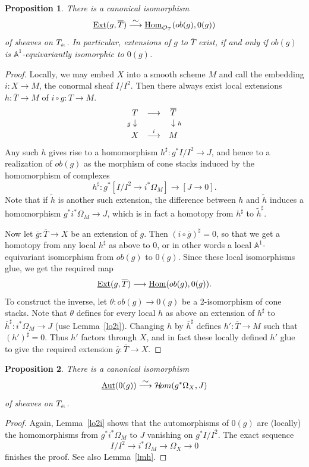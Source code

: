 \documentclass[11pt]{article}
\theoremstyle{plain}
\newtheorem{prop}{Proposition}[section]
\theoremstyle{definition}
\newenvironment{pf}{\begin{proof}}{\end{proof}}
\renewcommand{\tilde}{\widetilde}
\newcommand{\et}{{\mbox{\tiny \'{e}t}}}
\newcommand{\upst}{^{\ast}}
\newcommand{\aaa}{{\mathbb{A}}}
\renewcommand{\O}{{\mathcal{O}}}
\newcommand{\hH}{{\mathcal{H}}}
\newcommand{\Hom}{\mathop{\rm Hom}\nolimits}
\newcommand{\Ext}{\mathop{\rm Ext}\nolimits}
\newcommand{\sheafhom}{\mathop{\rm {\mit{ \hH\! om}}}\nolimits}
\newcommand{\Aut}{\mathop{\rm Aut}\nolimits}
\newcommand{\comp}{\mathbin{{\scriptstyle\circ}}}
\newcommand{\ol}{\overline}
\renewcommand{\ul}{\underline}
\newcommand{\ldiag}[1]
       {\makebox[0cm]{\({\scriptstyle#1}\downarrow\phantom{\scriptstyle#1}\)}}
\newcommand{\rdiag}[1]
       {\makebox[0cm]{\(\phantom{\scriptstyle#1}\downarrow{\scriptstyle#1}\)}}
\newcommand{\longiso}{\stackrel{\textstyle\sim}{\longrightarrow}}
\newcommand{\comdia}[9]{
\begin{array}{ccc}
#1 & \stackrel{#2}{\longrightarrow} & #3 \\
\ldiag{#4} & #5 & \rdiag{#6} \\
#7 & \stackrel{#8}{\longrightarrow} & #9
\end{array}}
\providecommand{\Aut}{\operatorname{Aut}}
\providecommand{\Ext}{\operatorname{Ext}}
\theoremstyle{plain}
\theoremstyle{definition}
\theoremstyle{remark}
\begin{document}
\begin{prop} \label{ince}
There is a canonical isomorphism
\[
\ul{\Ext}(g,\ol{T})\longiso\ul{\Hom}_{\O_T}(ob(g),0(g))
\]
of sheaves on \(T_\et\). In particular, extensions of \(g\) to \(\ol T\)
exist, if and only if \(ob(g)\) is \(\aaa^1\)-equivariantly isomorphic to
\(0(g)\).
\end{prop}
\begin{pf}
Locally, we may embed \(X\) into a smooth scheme \(M\) and call the
embedding \(i:X\to M\), the conormal sheaf \(I/I^2\). Then there always
exist local extensions \(h:\ol{T}\to M\) of \(i\comp g:T\to M\).
\[
\comdia{T}{}{\ol T}{g}{}{h}{X}{i}{M}
\]
Any such \(h\) gives rise to a homomorphism \(h^\sharp:g\upst I/I^2\to
J\), and hence to a realization of \(ob(g)\) as the morphism of cone
stacks induced by the homomorphism of complexes
\[
h^\sharp:g\upst[I/I^2\to i\upst\Omega_M]\longrightarrow[J\to0].
\]
Note that if \(\tilde{h}\) is another such extension, the difference
between \(h\) and \(\tilde h\) induces a homomorphism \(g\upst i\upst
\Omega_M\to J\), which is in fact a homotopy from \(h^\sharp\) to
\(\tilde{h}^\sharp\).

Now let \(\ol{g}:\ol{T}\to X\) be an extension of \(g\). Then \((i\comp\ol
g)^\sharp=0\), so that we get a homotopy from any local \(h^\sharp\) as
above to \(0\), or in other words a local \(\aaa^1\)-equivariant
isomorphism from \(ob(g)\) to \(0(g)\). Since these local isomorphisms
glue, we get the required map
\[
\ul{\Ext}(g,\ol{T})\longrightarrow\ul{\Hom}(ob(g),0(g)).
\]
To construct the inverse, let \(\theta:ob(g)\to0(g)\) be a 2-isomorphism
of cone stacks. Note that \(\theta\) defines for every local \(h\) as
above an extension of \(h^\sharp\) to \(\ol{h}^\sharp:i\upst\Omega_M\to J\)
(use Lemma~\ref{lo2i}). Changing \(h\) by \(\ol{h}^\sharp\) defines
\(h':\ol{T}\to M\) such that \((h')^\sharp=0\). Thus \(h'\) factors through
\(X\), and in fact these locally defined \(h'\) glue to give the required
extension \(\ol{g}:\ol{T}\to X\).
\end{pf}

\begin{prop}
There is a canonical isomorphism
\[
\ul{\Aut}(0(g))\longiso\sheafhom(g\upst\Omega_X,J)
\]
of sheaves on \(T_\et\).
\end{prop}
\begin{pf}
Again, Lemma~\ref{lo2i} shows that the automorphisms of \(0(g)\) are
(locally) the homomorphisms from \(g\upst i\upst \Omega_M\) to \(J\)
vanishing on \(g\upst I/I^2\). The exact sequence
\[
I/I^2\longrightarrow i\upst \Omega_M\longrightarrow
\Omega_X\longrightarrow 0
\]
finishes the proof. See also Lemma~\ref{lmh}.
\end{pf}
\end{document}
